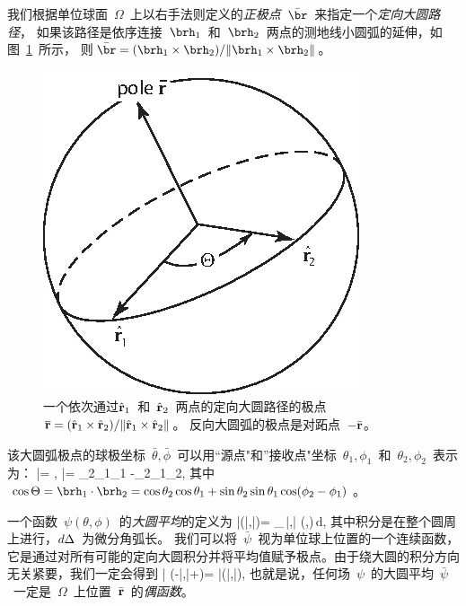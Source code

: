 我们根据单位球面~$\Omega$~上以右手法则定义的{\em 正极点\/}~$\bar{\br}$~来指定一个{\em 定向大圆路径\/}，
%
%
%
如果该路径是依序连接~$\brh_1$~和~$\brh_2$~两点的测地线小圆弧的延伸，如图~\ref{B.fig:gtcirc}~所示，
则$\bar{\br}=(\brh_1\times\brh_2)/
\|\brh_1\times\brh_2\|$。
\begin{figure}[!b]
\begin{center}
\includegraphics{../figures/appendixB/fig05.eps}
\end{center}
\caption[GC Pole]{\label{B.fig:gtcirc}
一个依次通过$\hat{\bf r}_1$~和~$\hat{\bf r}_2$~两点的定向大圆路径的极点~$\overline{\bf r}=(\hat{\bf r}_1\times\hat{\bf r}_2)
/\|\hat{\bf r}_1\times\hat{\bf r}_2\|$。
反向大圆弧的极点是对跖点~$-\bar{\bf r}$。}
\end{figure}
该大圆弧极点的球极坐标~$\bar{\theta},\bar{\phi}$~可以用“源点"和”接收点"坐标~$\theta_1,\phi_1$~和~$\theta_2,\phi_2$~表示为：
\eq \label{B.poledef1}
\cos\bar{\theta}=
{\sin\Theta},
\en
\eq
\label{B.poledef2}
\tan\bar{\phi}=
{\cos\theta_2\sin\theta_1\sin\phi_1
-\sin\theta_2\cos\theta_1\sin\phi_2},
\en
其中~$\cos\Theta=\brh_1\cdot\brh_2=
\cos\theta_2\cos\theta_1+\sin\theta_2
\sin\theta_1\cos(\phi_2-\phi_1)$。

一个函数~$\psi(\theta,\phi)$~的{\em 大圆平均\/}的定义为
%
\eq \label{B.gtcircave}
\bar{\psi}(\bar{\theta},\bar{\phi})=
\oint_{\,\bar{\theta},\bar{\phi}}
\psi(\theta,\phi)\,d\/\Delta,
\en
其中积分是在整个圆周上进行，$d\/\Delta$~为微分角弧长。
我们可以将~$\bar{\psi}$~视为单位球上位置的一个连续函数，它是通过对所有可能的定向大圆积分并将平均值赋予极点。由于绕大圆的积分方向无关紧要，我们一定会得到
\eq \label{B.psibareven}
\bar{\psi}
(\pi-\bar{\theta},\bar{\phi}+\pi)=
\bar{\psi}(\bar{\theta},\bar{\phi}),
\en
也就是说，任何场~$\psi$~的大圆平均~$\bar{\psi}$~一定是~$\Omega$~上位置~$\bar{\bf r}$~的{\em 偶函数\/}。
%

